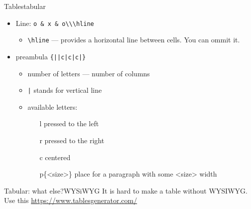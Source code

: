 \begin{frame}[fragile]{Tables}{tabular}\relax
     \begin{itemize}
         \item Line: \verb!o & x & o\\\hline!
         \begin{itemize}
             $\left.
             \begin{tabular}{p{.4\textwidth}} \vspace{-2ex}
             \item {\csk \&} --- moves to the next cell
             \item {\csk \verb!\\!} --- moves to the next line
             \end{tabular}
             \right\}\text{{\csk it is common, remember!}}$
             \item {\csk \verb!\hline!} --- provides a horizontal line between cells. You can ommit it.
         \end{itemize}
         \item preambula {\csk \verb!{||c|c|c|}!} 
         \begin{itemize}
             \item number of letters --- number of columns
             \item {\csk \verb!|!} stands for vertical line 
             \item available letters:
             \begin{itemize}
                 \item[l] pressed to the left
                 \item[r] pressed to the right
                 \item[c] centered
                 \item[p\{<size>\}] place for a paragraph with some <size> width 
             \end{itemize}
         \end{itemize}
     \end{itemize}
\end{frame}

\begin{frame}[fragile]{Tabular: what else?}{WYSiWYG}\relax
It is hard to make a table without WYSIWYG. Use this {\csk\url{https://www.tablesgenerator.com/}}
\end{frame}


